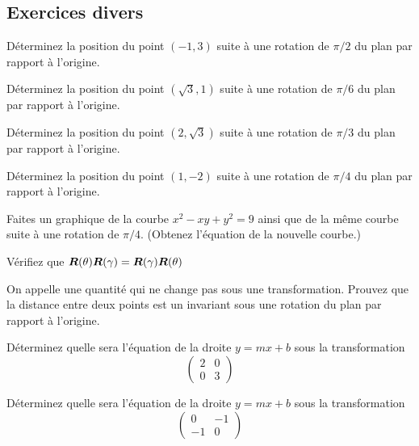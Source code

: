 \begin{TwoCol}
\section{Exercices divers}
\begin{exercice}
Déterminez la position du point $(-1, 3)$ suite à une rotation de $\pi/2$ du plan par rapport à l'origine.
\end{exercice}
\begin{exercice}
Déterminez la position du point $(\sqrt{3}, 1)$ suite à une rotation de $\pi/6$ du plan par rapport à l'origine.
\end{exercice}
\begin{exercice}
Déterminez la position du point $(2, \sqrt{3})$ suite à une rotation de $\pi/3$ du plan par rapport à l'origine.
\end{exercice}
\begin{exercice}
Déterminez la position du point $(1, -2)$ suite à une rotation de $\pi/4$ du plan par rapport à l'origine.
\end{exercice}
\begin{exercice}
Faites un graphique de la courbe $x^2 -xy + y^2 = 9$ ainsi que de la même courbe suite à une rotation de
$\pi/4$.  (Obtenez l'équation de la nouvelle courbe.)
\end{exercice}
\begin{exercice}
Vérifiez que $\boldsymbol{R}(\theta)\boldsymbol{R}(\gamma) = \boldsymbol{R}(\gamma)\boldsymbol{R}(\theta)$
\end{exercice}
\begin{exercice}
On appelle  une quantité qui ne change pas sous une transformation.
Prouvez que la distance entre deux points est un invariant sous une rotation du plan par rapport à l'origine.
\end{exercice}
\begin{exercice}
Déterminez quelle sera l'équation de la droite $y=mx+b$ sous la transformation $$\begin{pmatrix}
2 & 0 \\
0 & 3
\end{pmatrix}
$$
\end{exercice}
\begin{exercice}
Déterminez quelle sera l'équation de la droite $y=mx+b$ sous la transformation $$\begin{pmatrix}
0 &-1 \\
-1 & 0
\end{pmatrix}
$$
\end{exercice}

\end{TwoCol}
